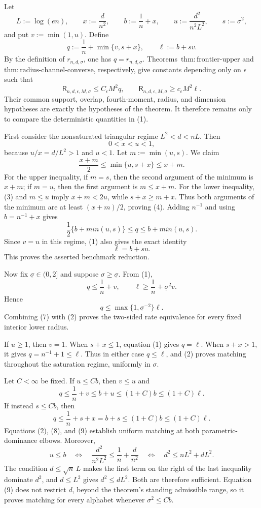 Let
\[
 L:=\log(en),\qquad x:=\frac d{n^2},\qquad
 b:=\frac1n+x,\qquad u:=\frac{d^2}{n^2L^2},
 \qquad s:=\sigma^2,
\]
and put \(v:=\min(1,u)\).  Define
\[
 q:=\frac1n+\min\{v,s+x\},
 \qquad
 \ell:=b+sv.
\tag{1}
\]
By the definition of \(r_{n,d,\sigma}\), one has \(q=r_{n,d,\sigma}\).  Theorems~\(\mathrm{thm:frontier\text{-}upper}\) and \(\mathrm{thm:radius\text{-}channel\text{-}converse}\), respectively, give constants depending only on \(\epsilon\) such that
\[
 \mathsf R_{n,d,\epsilon,M,\sigma}\le C_{\epsilon}M^2q,
 \qquad
 \mathsf R_{n,d,\epsilon,M,\sigma}\ge c_{\epsilon}M^2\ell.
\tag{2}
\]
Their common support, overlap, fourth-moment, radius, and dimension hypotheses are exactly the hypotheses of the theorem.  It therefore remains only to compare the deterministic quantities in (1).

First consider the nonsaturated triangular regime \(L^2<d<nL\).  Then
\[
 0<x<u<1,
\tag{3}
\]
because \(u/x=d/L^2>1\) and \(u<1\).  Let \(m:=\min(u,s)\).  We claim
\[
 \frac{x+m}{2}\le\min\{u,s+x\}\le x+m.
\tag{4}
\]
For the upper inequality, if \(m=s\), then the second argument of the minimum is \(x+m\); if \(m=u\), then the first argument is \(m\le x+m\).  For the lower inequality, (3) and \(m\le u\) imply \(x+m<2u\), while \(s+x\ge m+x\).  Thus both arguments of the minimum are at least \((x+m)/2\), proving (4).  Adding \(n^{-1}\) and using \(b=n^{-1}+x\) gives
\[
 \frac12\{b+min(u,s)\}\le q\le b+min(u,s).
\tag{5}
\]
Since \(v=u\) in this regime, (1) also gives the exact identity
\[
 \ell=b+su.
\tag{6}
\]
This proves the asserted benchmark reduction.

Now fix \(\underline\sigma\in(0,2]\) and suppose \(\sigma\ge\underline\sigma\).  From (1),
\[
 q\le\frac1n+v,
 \qquad
 \ell\ge\frac1n+\underline\sigma^2v.
\]
Hence
\[
 q\le\max\{1,\underline\sigma^{-2}\}\ell.
\tag{7}
\]
Combining (7) with (2) proves the two-sided rate equivalence for every fixed interior lower radius.

If \(u\ge1\), then \(v=1\).  When \(s+x\le1\), equation (1) gives \(q=\ell\).  When \(s+x>1\), it gives \(q=n^{-1}+1\le\ell\).  Thus in either case \(q\le\ell\), and (2) proves matching throughout the saturation regime, uniformly in \(\sigma\).

Let \(C<\infty\) be fixed.  If \(u\le Cb\), then \(v\le u\) and
\[
 q\le\frac1n+v\le b+u\le(1+C)b\le(1+C)\ell.
\tag{8}
\]
If instead \(s\le Cb\), then
\[
 q\le\frac1n+s+x=b+s\le(1+C)b\le(1+C)\ell.
\tag{9}
\]
Equations (2), (8), and (9) establish uniform matching at both parametric-dominance elbows.  Moreover,
\[
 u\le b
 \quad\Longleftrightarrow\quad
 \frac{d^2}{n^2L^2}\le\frac1n+\frac d{n^2}
 \quad\Longleftrightarrow\quad
 d^2\le nL^2+dL^2.
\tag{10}
\]
The condition \(d\le\sqrt n\,L\) makes the first term on the right of the last inequality dominate \(d^2\), and \(d\le L^2\) gives \(d^2\le dL^2\).  Both are therefore sufficient.  Equation (9) does not restrict \(d\), beyond the theorem's standing admissible range, so it proves matching for every alphabet whenever \(\sigma^2\le Cb\).

